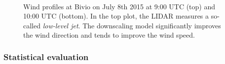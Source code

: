 \documentclass[twocolumn,letterpaper]{IEEEAerospaceCLS}
\begin{document}
\begin{figure}[htbp]
\centering
{}\\[1.2ex]
\caption{Wind profiles at Bivio on July 8th 2015 at 9:00 UTC (top) and 10:00 UTC (bottom). In the top plot, the LIDAR measures a so-called \emph{low-level jet}. The downscaling model significantly improves the wind direction and tends to improve the wind speed.}
\label{fig:PL_WindPred_valley_breeze_profile}
\end{figure}


\subsubsection{Statistical evaluation}
\label{sec:PL_WindPred_evaluation}
\end{document}
